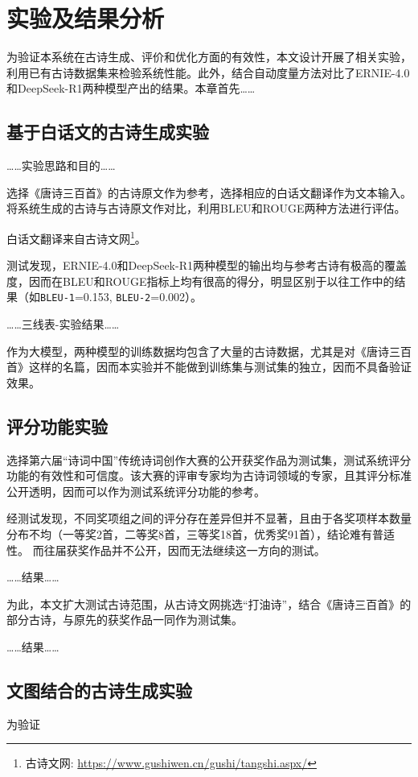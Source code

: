 
\chapter{实验及结果分析}

为验证本系统在古诗生成、评价和优化方面的有效性，本文设计开展了相关实验，利用已有古诗数据集来检验系统性能。此外，结合自动度量方法对比了ERNIE-4.0和DeepSeek-R1两种模型产出的结果。本章首先……

\section{基于白话文的古诗生成实验}

……实验思路和目的……

选择《唐诗三百首》的古诗原文作为参考，选择相应的白话文翻译作为文本输入。将系统生成的古诗与古诗原文作对比，利用BLEU和ROUGE两种方法进行评估。

白话文翻译来自古诗文网\footnote{古诗文网: \url{https://www.gushiwen.cn/gushi/tangshi.aspx/}}。


测试发现，ERNIE-4.0和DeepSeek-R1两种模型的输出均与参考古诗有极高的覆盖度，因而在BLEU和ROUGE指标上均有很高的得分，明显区别于以往工作中的结果（如\verb|BLEU-1|=0.153, \verb|BLEU-2|=0.002）。

……三线表-实验结果……

作为大模型，两种模型的训练数据均包含了大量的古诗数据，尤其是对《唐诗三百首》这样的名篇，因而本实验并不能做到训练集与测试集的独立，因而不具备验证效果。


\section{评分功能实验}

选择第六届“诗词中国”传统诗词创作大赛的公开获奖作品为测试集，测试系统评分功能的有效性和可信度。该大赛的评审专家均为古诗词领域的专家，且其评分标准公开透明，因而可以作为测试系统评分功能的参考。

经测试发现，不同奖项组之间的评分存在差异但并不显著，且由于各奖项样本数量分布不均（一等奖2首，二等奖8首，三等奖18首，优秀奖91首），结论难有普适性。 而往届获奖作品并不公开，因而无法继续这一方向的测试。

……结果……


为此，本文扩大测试古诗范围，从古诗文网挑选“打油诗”，结合《唐诗三百首》的部分古诗，与原先的获奖作品一同作为测试集。

……结果……

\section{文图结合的古诗生成实验}

为验证